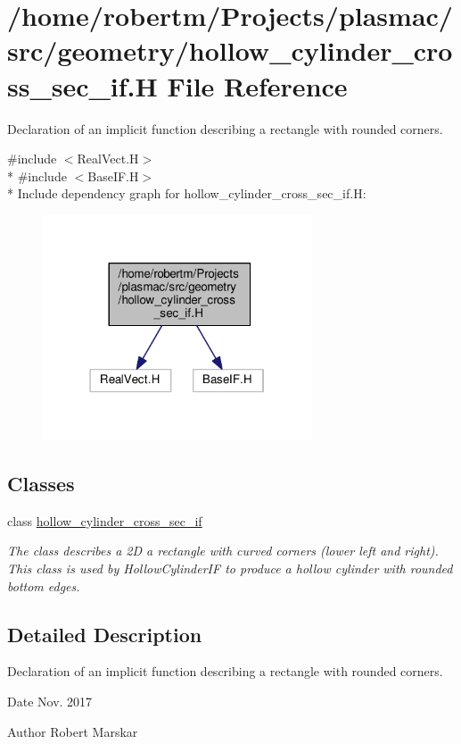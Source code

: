 \hypertarget{hollow__cylinder__cross__sec__if_8H}{}\section{/home/robertm/\+Projects/plasmac/src/geometry/hollow\+\_\+cylinder\+\_\+cross\+\_\+sec\+\_\+if.H File Reference}
\label{hollow__cylinder__cross__sec__if_8H}


Declaration of an implicit function describing a rectangle with rounded corners.  


{\ttfamily \#include $<$Real\+Vect.\+H$>$}\\*
{\ttfamily \#include $<$Base\+I\+F.\+H$>$}\\*
Include dependency graph for hollow\+\_\+cylinder\+\_\+cross\+\_\+sec\+\_\+if.\+H\+:\nopagebreak
\begin{figure}[H]
\begin{center}
\leavevmode
\includegraphics[width=226pt]{hollow__cylinder__cross__sec__if_8H__incl}
\end{center}
\end{figure}
\subsection*{Classes}
\begin{DoxyCompactItemize}
\item 
class \hyperlink{classhollow__cylinder__cross__sec__if}{hollow\+\_\+cylinder\+\_\+cross\+\_\+sec\+\_\+if}
\begin{DoxyCompactList}\small\item\em The class describes a 2D a rectangle with curved corners (lower left and right). This class is used by Hollow\+Cylinder\+IF to produce a hollow cylinder with rounded bottom edges. \end{DoxyCompactList}\end{DoxyCompactItemize}


\subsection{Detailed Description}
Declaration of an implicit function describing a rectangle with rounded corners. 

\begin{DoxyDate}{Date}
Nov. 2017 
\end{DoxyDate}
\begin{DoxyAuthor}{Author}
Robert Marskar 
\end{DoxyAuthor}
